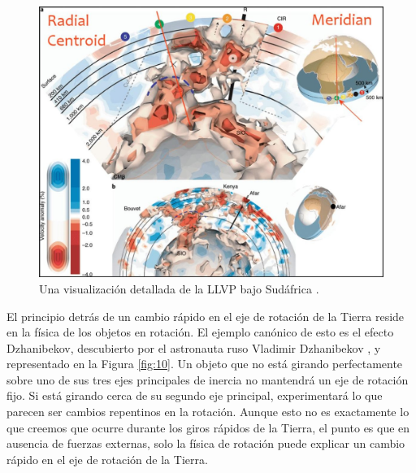 \documentclass[10pt,twocolumn,letterpaper]{article}
\begin{document}
\begin{figure}[t]
\begin{center}
   \includegraphics[width=1\linewidth]{llvp.jpg}
\end{center}
   \caption{Una visualización detallada de la LLVP bajo Sudáfrica \cite{28}.}
\label{fig:12}
\label{fig:onecol}
\end{figure}

El principio detrás de un cambio rápido en el eje de rotación de la Tierra reside en la física de los objetos en rotación. El ejemplo canónico de esto es el efecto Dzhanibekov, descubierto por el astronauta ruso Vladimir Dzhanibekov \cite{37}, y representado en la Figura \ref{fig:10}. Un objeto que no está girando perfectamente sobre uno de sus tres ejes principales de inercia no mantendrá un eje de rotación fijo. Si está girando cerca de su segundo eje principal, experimentará lo que parecen ser cambios repentinos en la rotación. Aunque esto no es exactamente lo que creemos que ocurre durante los giros rápidos de la Tierra, el punto es que en ausencia de fuerzas externas, solo la física de rotación puede explicar un cambio rápido en el eje de rotación de la Tierra.
\end{document}
